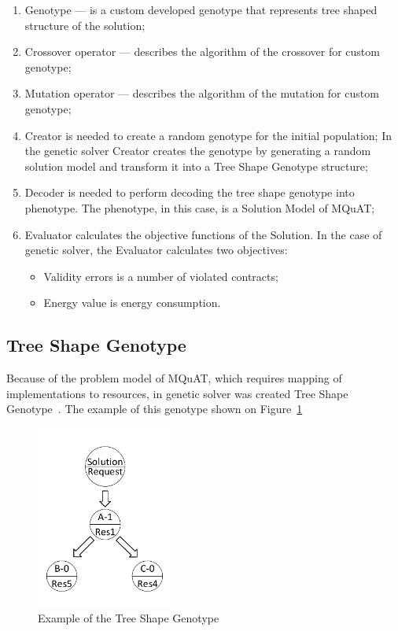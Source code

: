 \begin{enumerate}
	\item Genotype — is a custom developed genotype that represents tree shaped structure of the solution;
	\item Crossover operator — describes the algorithm of the crossover for custom genotype;
	\item Mutation operator — describes the algorithm of the mutation for custom genotype;
	\item Creator is needed to create a random genotype for the initial population;
	In the genetic solver Creator creates the genotype by generating a random solution model and transform it into a Tree Shape Genotype structure;
	\item Decoder is needed to perform decoding the tree shape genotype into phenotype. The phenotype, in this case, is a Solution Model of MQuAT;
	\item Evaluator calculates the objective functions of the Solution. In the case of genetic solver, the Evaluator calculates two objectives: 
	
	\begin{itemize}
		\item Validity errors is a number of violated contracts;
		\item Energy value is energy consumption.
	\end{itemize}
	
\end{enumerate}

\subsection{Tree Shape Genotype}

Because of the problem model of MQuAT, which requires mapping of implementations to resources, in genetic solver was created Tree Shape Genotype~\cite{ahmad18}.
The example of this genotype shown on Figure~\ref{fig:TreeShapeGenotypeExample}

\begin{figure}
	\centering
	\includegraphics[width=0.4\textwidth]{images/TreeShapeGenotypeExample.pdf}
	\caption[Example of the Tree Shape Genotype]{Example of the Tree Shape Genotype}
	\label{fig:TreeShapeGenotypeExample}
\end{figure}

